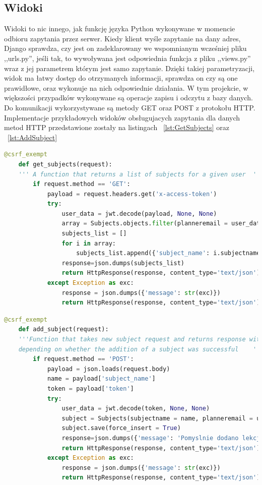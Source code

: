 \subsection{Widoki}
Widoki to nic innego, jak funkcję języka Python wykonywane w momencie odbioru zapytania przez serwer. Kiedy klient wyśle zapytanie na dany adres, Django sprawdza, czy jest on zadeklarowany we wspomnianym wcześniej pliku ,,urls.py'', jeśli tak, to wywoływana jest odpowiednia funkcja z pliku ,,views.py'' wraz z jej parametrem którym jest samo zapytanie. Dzięki takiej parametryzacji, widok ma łatwy dostęp do otrzymanych informacji, sprawdza on czy są one prawidłowe, oraz wykonuje na nich odpowiednie działania. W tym projekcie, w większości przypadków wykonywane są operacje zapisu i odczytu z bazy danych. Do komunikacji wykorzystywane są metody GET oraz POST z protokołu HTTP.
Implementacje przykładowych widoków obsługujacych zapytania dla danych metod HTTP przedstawione zostały na listingach ~\ref{lst:GetSubjects} oraz ~\ref{lst:AddSubject}
\begin{lstlisting}[language=Python, caption=Widok obsługujący zapytanie typu GET, label={lst:GetSubjects}]
	@csrf_exempt
	def get_subjects(request):
	''' A function that returns a list of subjects for a given user  '''
		if request.method == 'GET':
			payload = request.headers.get('x-access-token')
			try:
				user_data = jwt.decode(payload, None, None)
				array = Subjects.objects.filter(planneremail = user_data['email'])
				subjects_list = []
				for i in array:
					subjects_list.append({'subject_name': i.subjectname})
				response=json.dumps(subjects_list)
				return HttpResponse(response, content_type='text/json')
			except Exception as exc:
				response = json.dumps({'message': str(exc)})
				return HttpResponse(response, content_type='text/json')
\end{lstlisting}

\begin{lstlisting}[language=Python, caption=Widok obsługujący zapytanie typu POST, label={lst:AddSubject}]
	@csrf_exempt
	def add_subject(request):
	'''Function that takes new subject request and returns response with the appropriate message,
	depending on whether the addition of a subject was successful    '''
		if request.method == 'POST':
			payload = json.loads(request.body)
			name = payload['subject_name']
			token = payload['token']
			try:
				user_data = jwt.decode(token, None, None)
				subject = Subjects(subjectname = name, planneremail = user_data["email"])
				subject.save(force_insert = True)
				response=json.dumps({'message': 'Pomyslnie dodano lekcje'})
				return HttpResponse(response, content_type='text/json')
			except Exception as exc:
				response = json.dumps({'message': str(exc)})
				return HttpResponse(response, content_type='text/json')
\end{lstlisting}

